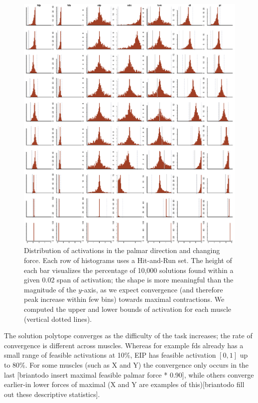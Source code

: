 \begin{figure}[htbp]
\centering
\includegraphics[width=\textwidth]{figs/Z_alphaProgression1430924065026.pdf}
\caption{Distribution of activations in the palmar direction and changing force. Each row of histograms uses a Hit-and-Run set. The height of each bar visualizes the percentage of 10,000 solutions found within a given 0.02 span of activation; the shape is more meaningful than the magnitude of the $y$-axis, as we expect convergence (and therefore peak increase within few bins) towards maximal contractions. We computed the upper and lower bounds of activation for each muscle (vertical dotted lines).}
\label{fig:Z_progression}
\end{figure}%

The solution polytope converges as the difficulty of the task increases; the rate of convergence is different across muscles. Whereas for example fds already has a small range of feasible activations at 10\%, EIP has feasible activation $[0,1]$ up to 80\%.
For some muscles (such as X and Y) the convergence only occurs in the last [briantodo insert maximal feasible palmar force * 0.90], while others converge earlier-in lower forces of maximal (X and Y are examples of this)[briantodo fill out these descriptive statistics].

